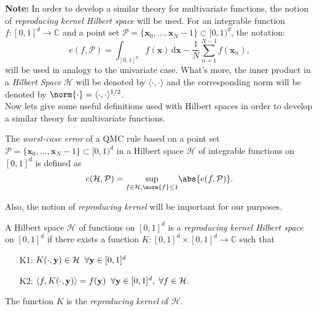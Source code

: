 \textbf{Note:}
In order to develop a similar theory for multivariate functions, the notion of \textit{reproducing kernel Hilbert space} will be used.
For an integrable function $f : [0,1]^d \longrightarrow \mathbb{C}$ and a point set $\mathcal{P} = \{\textbf{x}_0,...,\textbf{x}_N-1\} \subset [0,1)^d$, the notation:
\begin{equation*}
    e(f,\mathcal{P}) = \int_{[0,1]^d} f(\textbf{x}) \,\mathrm{d}\textbf{x} - \frac{1}{N} \sum_{n=1}^{N-1} f(\textbf{x}_n),
\end{equation*}
will be used in analogy to the univariate case. What's more, the inner product in a \textit{Hilbert Space} $\mathcal{H}$ will be denoted by $\langle \cdot,\cdot \rangle$ and the corresponding norm will be denoted by $\norm{\cdot} = \langle \cdot,\cdot \rangle^{1/2}$.\\


Now lets give some useful definitions used with Hilbert spaces in order to develop a similar theory for multivariate functions.\\

\begin{Def}
    The \textit{worst-case error} of a QMC rule based on a point set $\mathcal{P} = \{\textbf{x}_0,...,\textbf{x}_N-1\} \subset [0,1)^d$ in a Hilbert space $\mathcal{H}$ of integrable functions on $[0,1]^d$ is defined as
    \begin{equation*}
        e(\mathcal{H},\mathcal{P}) = \underset{f \in \mathcal{H}, \norm{f}\leq 1}{\text{sup}} \abs{e(f,\mathcal{P})}.
    \end{equation*}
\end{Def}

\vspace{2mm}
Also, the notion of \textit{reproducing kernel} will be important for our purposes.\\

\begin{Def}
    A Hilbert space $\mathcal{H}$ of functions on $[0,1]^d$ is a \textit{reproducing kernel Hilbert space} on $[0,1]^d$ if there exists a function $K : [0,1]^d \times [0,1]^d \longrightarrow \mathbb{C}$ such that
    \begin{itemize}
        \item[K1:]\label{K1} $K(\cdot,\textbf{y}) \in \mathcal{H} \hspace{2mm} \forall \textbf{y} \in [0,1]^d$ 
        \item[K2:]\label{K2} $\langle f,K(\cdot,\textbf{y}) \rangle = f(\textbf{y}) \hspace{2mm} \forall \textbf{y} \in [0,1]^d, \hspace{1mm} \forall f\in \mathcal{H}$.
    \end{itemize}
    The function $K$ is the \textit{reproducing kernel} of $\mathcal{H}$.\\
\end{Def}

